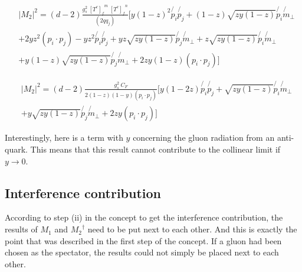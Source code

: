 
%


\begin{equation}
\begin{split}
&|M_2|^2 =(d-2) \frac{g_s^2 \: {[T^c]_f}^m \: {[T^c]_{f}}^n }{(2qq_j)} [
y(1-z)^2\not{p_i}\not{p_j}+(1-z)\sqrt{zy(1-z)}\not{p_i}\not{m}_{\bot}\\
&+2yz^2 (p_i \cdot p_j)-yz^2 \not{p_i}\not{p_j}+yz\sqrt{zy(1-z)}\not{p_j}\not{m}_{\bot}+z\sqrt{zy(1-z)}\not{p_i}\not{m}_{\bot}\\
&+y(1-z)\sqrt{zy(1-z)}\not{p_j}\not{m}_{\bot} +2zy(1-z)(p_i \cdot p_j)]
\end{split}
\end{equation}

\begin{equation}
\begin{split}
&|M_2|^2 =(d-2) \frac{g_s^2 \: C_F }{2(1-z)(1-y) (p_i \cdot p_j)} [
y(1-2z)\not{p_i}\not{p_j}+\sqrt{zy(1-z)}\not{p_i}\not{m}_{\bot}\\
&+y\sqrt{zy(1-z)}\not{p_j}\not{m}_{\bot} +2zy(p_i \cdot p_j)]
\end{split}
\end{equation}


Interestingly, here is a term with $y$ concerning the gluon radiation from an anti-quark. This means that this result cannot contribute to the collinear limit if $ y \rightarrow 0 $.


\subsection{Interference contribution}
According to step (ii) in the concept to get the interference contribution, the results of $M_1$ and ${M_2}^{\dagger}$ need to be put next to each other. And this is exactly the point that was described in the first step of the concept. If a gluon had been chosen as the spectator, the results could not simply be placed next to each other. 

